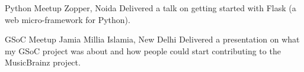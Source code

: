     {Python Meetup}
    {}
    {Zopper, Noida}
    {}
    {
        Delivered a talk on getting started with Flask (a web micro-framework for Python).
    }
    \vspace*{0.2\baselineskip}

    {GSoC Meetup}
    {}
    {Jamia Millia Islamia, New Delhi}
    {}
    {
        Delivered a presentation on what my GSoC project was about and how people could
        start contributing to the MusicBrainz project.
    }
    \vspace*{0.2\baselineskip}
